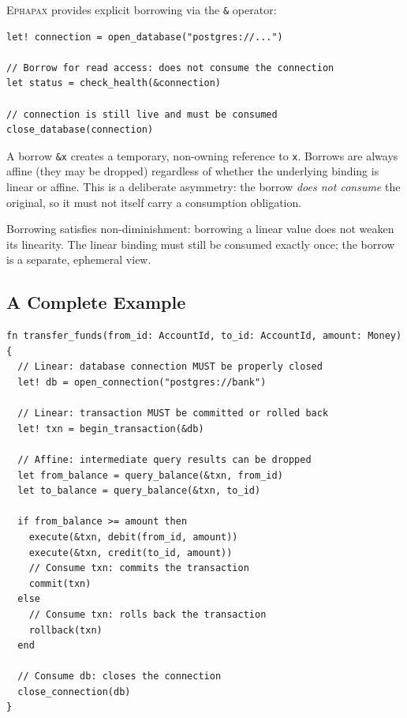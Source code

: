 \documentclass[11pt,a4paper]{article}
\newcommand{\Ephapax}{\textsc{Ephapax}}
\begin{document}
\Ephapax{} provides explicit borrowing via the \lstinline{&} operator:

\begin{lstlisting}[language=Ephapax, caption={Borrowing provides temporary read access without consuming.}]
let! connection = open_database("postgres://...")

// Borrow for read access: does not consume the connection
let status = check_health(&connection)

// connection is still live and must be consumed
close_database(connection)
\end{lstlisting}

A borrow \lstinline{&x} creates a temporary, non-owning reference to \lstinline{x}.
Borrows are always affine (they may be dropped) regardless of whether the
underlying binding is linear or affine. This is a deliberate asymmetry: the
borrow \emph{does not consume} the original, so it must not itself carry a
consumption obligation.

Borrowing satisfies non-diminishment: borrowing a linear value does not weaken
its linearity. The linear binding must still be consumed exactly once; the
borrow is a separate, ephemeral view.

\subsection{A Complete Example}

\begin{lstlisting}[language=Ephapax, caption={Dyadic resource management in \Ephapax{}.}, label=lst:complete]
fn transfer_funds(from_id: AccountId, to_id: AccountId, amount: Money) {
  // Linear: database connection MUST be properly closed
  let! db = open_connection("postgres://bank")

  // Linear: transaction MUST be committed or rolled back
  let! txn = begin_transaction(&db)

  // Affine: intermediate query results can be dropped
  let from_balance = query_balance(&txn, from_id)
  let to_balance = query_balance(&txn, to_id)

  if from_balance >= amount then
    execute(&txn, debit(from_id, amount))
    execute(&txn, credit(to_id, amount))
    // Consume txn: commits the transaction
    commit(txn)
  else
    // Consume txn: rolls back the transaction
    rollback(txn)
  end

  // Consume db: closes the connection
  close_connection(db)
}
\end{lstlisting}
\end{document}
